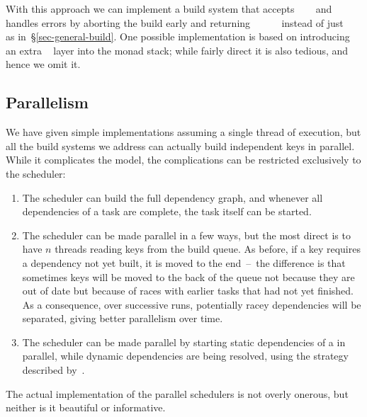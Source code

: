 \noindent
With this approach we can implement a build system that accepts
~~~ and handles errors by aborting the
build early and returning
~~~~~ instead of just
~~~ as in~\S\ref{sec-general-build}. One possible
implementation is based on introducing an extra ~ layer
into the monad stack; while fairly direct it is also tedious, and hence we omit
it.


\subsection{Parallelism}\label{sec-parallelism}

We have given simple implementations assuming a single thread of execution,
but all the build systems we address can actually build independent keys in
parallel. While it complicates the model, the complications can be restricted
exclusively to the scheduler:

\begin{enumerate}
\item The  scheduler can build the full dependency graph, and
whenever all dependencies of a task are complete, the task itself can be
started.

\item The  scheduler can be made parallel in a few ways, but the
most direct is to have $n$ threads reading keys from the build queue. As before,
if a key requires a dependency not yet built, it is moved to the end~--~the
difference is that sometimes keys will be moved to the back of the queue not
because they are out of date but because of races with earlier tasks that had
not yet finished. As a consequence, over successive runs, potentially racey
dependencies will be separated, giving better parallelism over time.

\item The  scheduler can be made parallel by starting static
dependencies of a  in parallel, while dynamic dependencies are being
resolved, using the strategy described by~\cite{marlow2014haxl}.
\end{enumerate}

The actual implementation of the parallel schedulers is not overly onerous,
but neither is it beautiful or informative.


